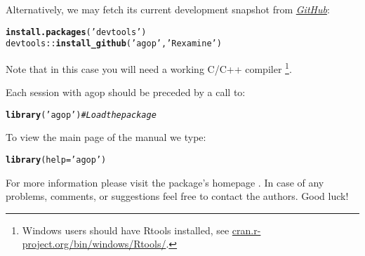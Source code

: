 \documentclass[11pt]{article}\usepackage[]{graphicx}\usepackage[]{color}
\makeatletter
\newcommand{\hlstr}[1]{\textcolor[rgb]{0.192,0.494,0.8}{#1}}%
\newcommand{\hlcom}[1]{\textcolor[rgb]{0.678,0.584,0.686}{\textit{#1}}}%
\newcommand{\hlstd}[1]{\textcolor[rgb]{0.345,0.345,0.345}{#1}}%
\newcommand{\hlkwc}[1]{\textcolor[rgb]{0.333,0.667,0.333}{#1}}%
\newcommand{\hlkwd}[1]{\textcolor[rgb]{0.737,0.353,0.396}{\textbf{#1}}}%
\newenvironment{kframe}{%
 \def\at@end@of@kframe{}%
 \ifinner\ifhmode%
  \def\at@end@of@kframe{\end{minipage}}%
  \begin{minipage}{\columnwidth}%
 \fi\fi%
 \def\FrameCommand##1{\hskip\@totalleftmargin \hskip-\fboxsep
 \colorbox{shadecolor}{##1}\hskip-\fboxsep
     \hskip-\linewidth \hskip-\@totalleftmargin \hskip\columnwidth}%
 \MakeFramed {\advance\hsize-\width
   \@totalleftmargin\z@ \linewidth\hsize
   \@setminipage}}%
 {\par\unskip\endMakeFramed%
 \at@end@of@kframe}
\newenvironment{knitrout}{}{} %
\newcommand{\package}[1]{\textsf{#1}\xspace}
\newcommand{\os}[1]{\textsf{#1}\xspace}
\newcommand{\lang}[1]{\textsf{#1}\xspace}
\theoremstyle{remark}
\theoremstyle{definition}
\makeatother
\begin{document}
\noindent
Alternatively, we may fetch its current development snapshot
from \href{https://github.com/Rexamine/agop}{\textit{GitHub}}:

\begin{knitrout}\small
{}\color{fgcolor}\begin{kframe}
\begin{alltt}
\hlkwd{install.packages}\hlstd{(}\hlstr{'devtools'}\hlstd{)}
\hlstd{devtools::}\hlkwd{install_github}\hlstd{(}\hlstr{'agop'}\hlstd{,} \hlstr{'Rexamine'}\hlstd{)}
\end{alltt}
\end{kframe}
\end{knitrout}

\noindent
Note that in this case you will need a working \lang{C}/\lang{C++} compiler%
\footnote{\os{Windows} users should have \textsf{Rtools} installed,
see \href{http://cran.r-project.org/bin/windows/Rtools/}%
{cran.r-project.org/bin/windows/Rtools/}.}.


\bigskip
Each session with \package{agop} should be preceded by
a call to:

\begin{knitrout}\small
{}\color{fgcolor}\begin{kframe}
\begin{alltt}
\hlkwd{library}\hlstd{(}\hlstr{'agop'}\hlstd{)} \hlcom{# Load the package}
\end{alltt}
\end{kframe}
\end{knitrout}

\bigskip
To view the main page of the manual we type:

\begin{knitrout}\small
{}\color{fgcolor}\begin{kframe}
\begin{alltt}
\hlkwd{library}\hlstd{(}\hlkwc{help}\hlstd{=}\hlstr{'agop'}\hlstd{)}
\end{alltt}
\end{kframe}
\end{knitrout}

\noindent
For more information please visit the package's homepage \cite{GagolewskiCena:agoppackage}.
In case of any problems, comments, or suggestions feel free to contact the authors.
Good luck!



\end{document}
